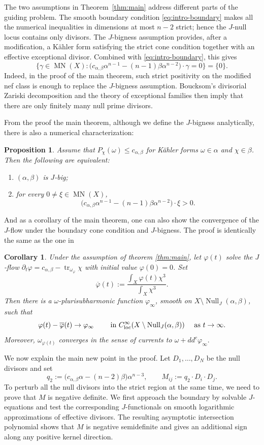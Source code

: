 \documentclass[reqno]{amsart}
\newcommand{\tr}{\operatorname{tr}}
\newcommand{\ddc}{dd^c}
\newcommand{\MN}{\operatorname{MN}}
\newcommand{\JNull}{\operatorname{Null}_{J}}
\newcommand{\cab}{c_{\alpha,\beta}}
\theoremstyle{plain}
\newtheorem{cor}[thm]{Corollary}
\newtheorem{proposition}[thm]{Proposition}
\theoremstyle{remark}
\begin{document}
The two assumptions in Theorem~\ref{thm:main} address different parts
of the guiding problem. The smooth boundary condition
\eqref{eq:intro-boundary} makes all the numerical inequalities in
dimensions at most $n-2$ strict; hence the $J$-null locus contains
only divisors. The $J$-bigness assumption provides, after a
modification, a K\"ahler form satisfying the strict cone condition
together with an effective exceptional divisor. Combined with
\eqref{eq:intro-boundary}, this gives
\[
 \bigl\{\gamma\in\MN(X):
  \bigl(\cab\alpha^{n-1}-(n-1)\beta\alpha^{n-2}\bigr)
  \cdot\gamma=0\bigr\}=\{0\}.
\]
Indeed, in the proof of the main theorem, such strict positivity on the modified nef class is enough to replace the $J$-bigness assumption.
Boucksom's divisorial Zariski decomposition and the theory of
exceptional families \cite{B04} then imply that there are only
finitely many null prime divisors.

From the proof the main theorem, although we define the $J$-bigness analytically, there is also a numerical characterization:
\begin{proposition}
Assume that $P_\chi(\omega)\leq\cab$ for K\"ahler forms
$\omega\in\alpha$ and $\chi\in\beta$. Then the following are
equivalent:
\begin{enumerate}[label=\textup{(\arabic*)}]
 \item $(\alpha,\beta)$ is $J$-big;
 \item for every $0\neq\xi\in\MN(X)$,
 \[
  \bigl(\cab\alpha^{n-1}-(n-1)\beta\alpha^{n-2}\bigr)\cdot\xi>0.
 \]
\end{enumerate}
\end{proposition}

And as a corollary of the main theorem, one can also show the convergence of the $J$-flow under the boundary cone condition and $J$-bigness. The proof is identically the same as the one in \cite{3d} 
\begin{cor}\label{cor:convergence-J-flow}Under the assumption of theorem \ref{thm:main}, let $\varphi(t)$ solve the $J$-flow $\partial_t\varphi=\cab-\tr_{\omega_\varphi}\chi$ with initial value $\varphi(0)=0$. Set \[\overline{\varphi}(t):=\frac{\int_X\varphi(t)\chi^3}{\int_X\chi^3}.
\]Then there is a $\omega$-plurisubharmonic function $\varphi_\infty$, smooth on $X\setminus \JNull(\alpha,\beta)$, such that \[
\varphi(t)-\overline{\varphi}(t)\to \varphi_{\infty}\qquad \text{ in }C^\infty_{\rm loc}(X\setminus \JNull(\alpha,\beta)) \quad \text{ as }t\to \infty
.\]
Moreover, $\omega_{\varphi(t)}$ converges in the sense of currents to $\omega+\ddc\varphi_\infty.$
    
\end{cor}
We now explain the main new point in the proof. Let
$D_1,\ldots,D_N$ be the null divisors and set
\[
 q_2:=\bigl(\cab\alpha-(n-2)\beta\bigr)\alpha^{n-3},
 \qquad M_{ij}:=q_2\cdot D_i\cdot D_j.
\]
To perturb all the null divisors into the strict region at the same time,
we need to prove that $M$ is negative definite. We first approach
the boundary by solvable $J$-equations and test the corresponding
$J$-functionals on smooth logarithmic approximations of effective
divisors. The resulting asymptotic intersection polynomial shows
that $M$ is negative semidefinite and gives an additional sign along
any positive kernel direction.
\end{document}
